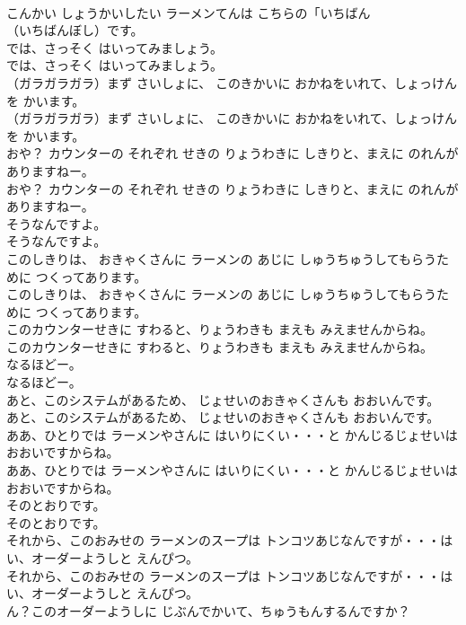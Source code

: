 \documentclass[8pt]{extreport}
\begin{document}
\begin{CJK}{UTF8}{min}
\\	こんかい しょうかいしたい ラーメンてんは こちらの「いちばん
\\	（いちばんぼし）です。
\\	では、さっそく はいってみましょう。
\\	では、さっそく はいってみましょう。
\\	（ガラガラガラ）まず さいしょに、 このきかいに おかねをいれて、しょっけんを かいます。
\\	（ガラガラガラ）まず さいしょに、 このきかいに おかねをいれて、しょっけんを かいます。
\\	おや？ カウンターの それぞれ せきの りょうわきに しきりと、まえに のれんが ありますねー。
\\	おや？ カウンターの それぞれ せきの りょうわきに しきりと、まえに のれんが ありますねー。
\\	そうなんですよ。
\\	そうなんですよ。
\\	このしきりは、 おきゃくさんに ラーメンの あじに しゅうちゅうしてもらうために つくってあります。
\\	このしきりは、 おきゃくさんに ラーメンの あじに しゅうちゅうしてもらうために つくってあります。
\\	このカウンターせきに すわると、りょうわきも まえも みえませんからね。
\\	このカウンターせきに すわると、りょうわきも まえも みえませんからね。
\\	なるほどー。
\\	なるほどー。
\\	あと、このシステムがあるため、 じょせいのおきゃくさんも おおいんです。
\\	あと、このシステムがあるため、 じょせいのおきゃくさんも おおいんです。
\\	ああ、ひとりでは ラーメンやさんに はいりにくい・・・と かんじるじょせいは おおいですからね。
\\	ああ、ひとりでは ラーメンやさんに はいりにくい・・・と かんじるじょせいは おおいですからね。
\\	そのとおりです。
\\	そのとおりです。
\\	それから、このおみせの ラーメンのスープは トンコツあじなんですが・・・はい、オーダーようしと えんぴつ。
\\	それから、このおみせの ラーメンのスープは トンコツあじなんですが・・・はい、オーダーようしと えんぴつ。
\\	ん？このオーダーようしに じぶんでかいて、ちゅうもんするんですか？

\end{CJK}
\end{document}
